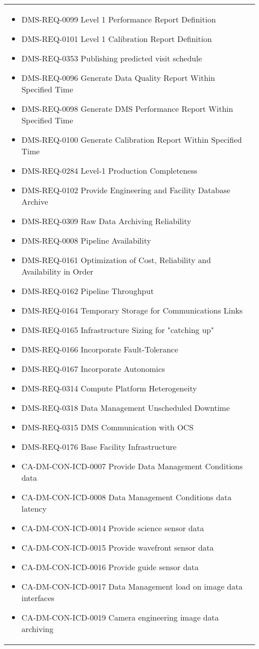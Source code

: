 \begin{xtabular}{lp{0.7\textwidth}}
\begin{itemize}
\item DMS-REQ-0099 Level 1 Performance Report Definition
\item DMS-REQ-0101 Level 1 Calibration Report Definition
\item DMS-REQ-0353 Publishing predicted visit schedule
\item DMS-REQ-0096 Generate Data Quality Report Within Specified Time
\item DMS-REQ-0098 Generate DMS Performance Report Within Specified Time
\item DMS-REQ-0100 Generate Calibration Report Within Specified Time
\item DMS-REQ-0284 Level-1 Production Completeness
\item DMS-REQ-0102 Provide Engineering and Facility Database Archive
\item DMS-REQ-0309 Raw Data Archiving Reliability
\item DMS-REQ-0008 Pipeline Availability
\item DMS-REQ-0161 Optimization of Cost, Reliability and Availability in Order
\item DMS-REQ-0162 Pipeline Throughput
\item DMS-REQ-0164 Temporary Storage for Communications Links
\item DMS-REQ-0165 Infrastructure Sizing for "catching up"
\item DMS-REQ-0166 Incorporate Fault-Tolerance
\item DMS-REQ-0167 Incorporate Autonomics
\item DMS-REQ-0314 Compute Platform Heterogeneity
\item DMS-REQ-0318 Data Management Unscheduled Downtime
\item DMS-REQ-0315 DMS Communication with OCS
\item DMS-REQ-0176 Base Facility Infrastructure
\item CA-DM-CON-ICD-0007 Provide Data Management Conditions data
\item CA-DM-CON-ICD-0008 Data Management Conditions data latency
\item CA-DM-CON-ICD-0014 Provide science sensor data
\item CA-DM-CON-ICD-0015 Provide wavefront sensor data
\item CA-DM-CON-ICD-0016 Provide guide sensor data
\item CA-DM-CON-ICD-0017 Data Management load on image data interfaces
\item CA-DM-CON-ICD-0019 Camera engineering image data archiving

\end{itemize}
\end{xtabular}
